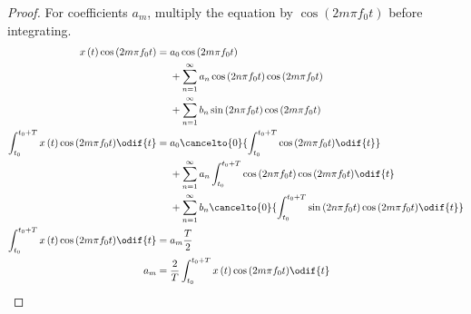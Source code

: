 \documentclass{article}
\begin{document}
\begin{proof}
    For coefficients \(a_m\), multiply the equation by \(\cos{\left( 2 m \pi f_0 t \right)}\) before integrating.
    \begin{align*}
        x\left( t \right) \cos{\left( 2 m \pi f_0 t \right)}                               & = \begin{aligned}[t]
                                                                                                    & a_0 \cos{\left( 2 m \pi f_0 t \right)}                                                          \\
                                                                                                    & + \sum_{n = 1}^\infty a_n \cos{\left( 2 n \pi f_0 t \right)} \cos{\left( 2 m \pi f_0 t \right)} \\
                                                                                                    & + \sum_{n = 1}^\infty b_n \sin{\left( 2 n \pi f_0 t \right)} \cos{\left( 2 m \pi f_0 t \right)}
                                                                                               \end{aligned}                                                    \\
        \int_{t_0}^{t_0 + T} x\left( t \right) \cos{\left( 2 m \pi f_0 t \right)} \odif{t} & = \begin{aligned}[t]
                                                                                                    & a_0 \cancelto{0}{\int_{t_0}^{t_0 + T} \cos{\left( 2 m \pi f_0 t \right)} \odif{t}}                                                          \\
                                                                                                    & + \sum_{n = 1}^\infty a_n \int_{t_0}^{t_0 + T} \cos{\left( 2 n \pi f_0 t \right)} \cos{\left( 2 m \pi f_0 t \right)} \odif{t}               \\
                                                                                                    & + \sum_{n = 1}^\infty b_n \cancelto{0}{\int_{t_0}^{t_0 + T} \sin{\left( 2 n \pi f_0 t \right)} \cos{\left( 2 m \pi f_0 t \right)} \odif{t}}
                                                                                               \end{aligned} \\
        \int_{t_0}^{t_0 + T} x\left( t \right) \cos{\left( 2 m \pi f_0 t \right)} \odif{t} & = a_m \frac{T}{2}                                                                                                                                       \\
        a_m                                                                                & = \frac{2}{T} \int_{t_0}^{t_0 + T} x\left( t \right) \cos{\left( 2 m \pi f_0 t \right)} \odif{t}
    \end{align*}


\end{proof}
\end{document}

